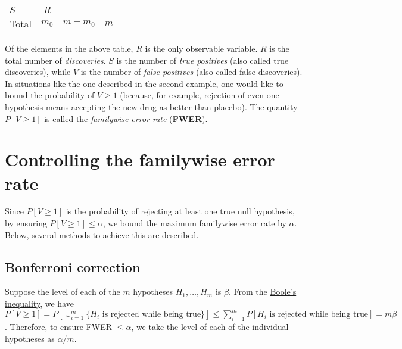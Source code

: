 \documentclass[
]{book}
\begin{document}
\begin{longtable}[]{@{}lccc@{}}
\begin{minipage}[t]{0.25\columnwidth}
\(S\)\strut
\end{minipage} & \begin{minipage}[t]{0.08\columnwidth}\centering
\(R\)\strut
\end{minipage}\tabularnewline
\begin{minipage}[t]{0.31\columnwidth}\raggedright
Total\strut
\end{minipage} & \begin{minipage}[t]{0.24\columnwidth}\centering
\(m_0\)\strut
\end{minipage} & \begin{minipage}[t]{0.25\columnwidth}\centering
\(m - m_0\)\strut
\end{minipage} & \begin{minipage}[t]{0.08\columnwidth}\centering
\(m\)\strut
\end{minipage}\tabularnewline
\bottomrule
\end{longtable}

Of the elements in the above table, \(R\) is the only observable variable. \(R\) is the total number of \emph{discoveries}. \(S\) is the number of \emph{true positives} (also called true discoveries), while \(V\) is the number of \emph{false positives} (also called false discoveries). In situations like the one described in the second example, one would like to bound the probability of \(V \ge 1\) (because, for example, rejection of even one hypothesis means accepting the new drug as better than placebo). The quantity \(P[ V \ge 1 ]\) is called the \emph{familywise error rate} (\textbf{FWER}).

\hypertarget{FWER}{%
\section{Controlling the familywise error rate}\label{FWER}}

Since \(P[ V \ge 1 ]\) is the probability of rejecting at least one true null hypothesis, by ensuring \(P[ V \ge 1 ] \le \alpha\), we bound the maximum familywise error rate by \(\alpha\). Below, several methods to achieve this are described.

\hypertarget{bonferroni}{%
\subsection{Bonferroni correction}\label{bonferroni}}

Suppose the level of each of the \(m\) hypotheses \(H_1, \ldots, H_m\) is \(\beta\). From the \href{https://en.wikipedia.org/wiki/Boole\%27s_inequality}{Boole's inequality}, we have \(P[ V \ge 1 ] = P\left[ \cup_{i=1}^{m} \{H_i \text{ is rejected while being true}\} \right] \le \sum_{i=1}^{m} P[H_i \text{ is rejected while being true}] = m \beta\). Therefore, to ensure FWER \(\le \alpha\), we take the level of each of the individual hypotheses as \(\alpha / m\).
\end{document}

